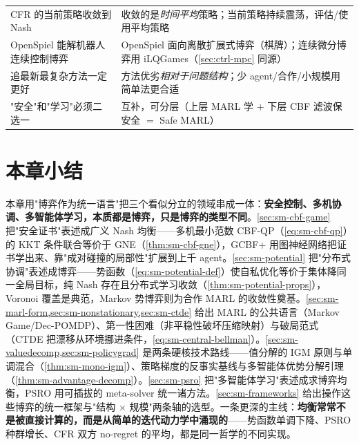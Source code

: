 \begin{table}[H]
\begin{tabular}{p{} p{}}
CFR 的当前策略收敛到 Nash & 收敛的是\emph{时间平均}策略；当前策略持续震荡，评估/使用平均策略 \\
OpenSpiel 能解机器人连续控制博弈 & OpenSpiel 面向离散扩展式博弈（棋牌）；连续微分博弈用 iLQGames（\cref{sec:ctrl-mpc} 同源）\\
追最新最复杂方法一定更好 & 方法优劣\emph{相对于问题结构}；少 agent/合作/小规模用简单法更合适 \\
"安全"和"学习"必须二选一 & 互补，可分层（上层 MARL 学 $+$ 下层 CBF 滤波保安全 $=$ Safe MARL）\\
\bottomrule
\end{tabular}
\end{table}

\section*{本章小结}

本章用"博弈作为统一语言"把三个看似分立的领域串成一体：\textbf{安全控制、多机协调、多智能体学习，本质都是博弈，只是博弈的类型不同}。\cref{sec:sm-cbf-game} 把"安全证书"表述成广义 Nash 均衡——多机最小范数 CBF-QP（\cref{eq:sm-cbf-qp}）的 KKT 条件联合等价于 GNE（\cref{thm:sm-cbf-gne}），GCBF+ 用图神经网络把证书学出来、靠"成对碰撞的局部性"扩展到上千 agent。\cref{sec:sm-potential} 把"分布式协调"表述成博弈——势函数（\cref{eq:sm-potential-def}）使自私优化等价于集体降同一全局目标，纯 Nash 存在且分布式学习收敛（\cref{thm:sm-potential-props}），Voronoi 覆盖是典范，Markov 势博弈则为合作 MARL 的收敛性奠基。\cref{sec:sm-marl-form,sec:sm-nonstationary,sec:sm-ctde} 给出 MARL 的公共语言（Markov Game/Dec-POMDP）、第一性困难（非平稳性破坏压缩映射）与破局范式（CTDE 把漂移从环境挪进条件，\cref{eq:sm-central-bellman}）。\cref{sec:sm-valuedecomp,sec:sm-policygrad} 是两条硬核技术路线——值分解的 IGM 原则与单调混合（\cref{thm:sm-mono-igm}）、策略梯度的反事实基线与多智能体优势分解引理（\cref{thm:sm-advantage-decomp}）。\cref{sec:sm-psro} 把"多智能体学习"表述成求博弈均衡，PSRO 用可插拔的 meta-solver 统一诸方法。\cref{sec:sm-frameworks} 给出操作这些博弈的统一框架与"结构 $\times$ 规模"两条轴的选型。一条更深的主线：\textbf{均衡常常不是被直接计算的，而是从简单的迭代动力学中涌现的}——势函数单调下降、PSRO 种群增长、CFR 双方 no-regret 的平均，都是同一哲学的不同实现。

